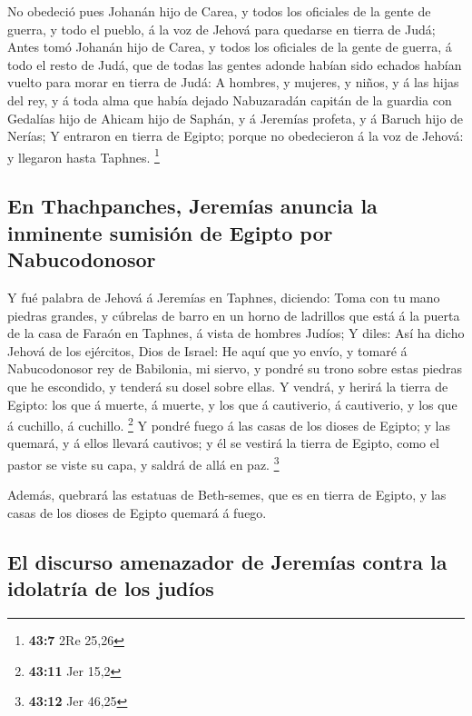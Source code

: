  No obedeció pues Johanán hijo de Carea, y todos los
oficiales de la gente de guerra, y todo el pueblo, á la voz de Jehová
para quedarse en tierra de Judá;  Antes tomó Johanán hijo de
Carea, y todos los oficiales de la gente de guerra, á todo el resto de
Judá, que de todas las gentes adonde habían sido echados habían vuelto
para morar en tierra de Judá:  A hombres, y mujeres, y
niños, y á las hijas del rey, y á toda alma que había dejado Nabuzaradán
capitán de la guardia con Gedalías hijo de Ahicam hijo de Saphán, y á
Jeremías profeta, y á Baruch hijo de Nerías;  Y entraron en
tierra de Egipto; porque no obedecieron á la voz de Jehová: y llegaron
hasta Taphnes. \footnote{\textbf{43:7} 2Re 25,26}

\hypertarget{en-thachpanches-jeremuxedas-anuncia-la-inminente-sumisiuxf3n-de-egipto-por-nabucodonosor}{%
\subsection{En Thachpanches, Jeremías anuncia la inminente sumisión de
Egipto por
Nabucodonosor}\label{en-thachpanches-jeremuxedas-anuncia-la-inminente-sumisiuxf3n-de-egipto-por-nabucodonosor}}

 Y fué palabra de Jehová á Jeremías en Taphnes, diciendo:
 Toma con tu mano piedras grandes, y cúbrelas de barro en un
horno de ladrillos que está á la puerta de la casa de Faraón en Taphnes,
á vista de hombres Judíos;  Y diles: Así ha dicho Jehová de
los ejércitos, Dios de Israel: He aquí que yo envío, y tomaré á
Nabucodonosor rey de Babilonia, mi siervo, y pondré su trono sobre estas
piedras que he escondido, y tenderá su dosel sobre ellas. 
Y vendrá, y herirá la tierra de Egipto: los que á muerte, á muerte, y
los que á cautiverio, á cautiverio, y los que á cuchillo, á cuchillo.
\footnote{\textbf{43:11} Jer 15,2}  Y pondré fuego á las
casas de los dioses de Egipto; y las quemará, y á ellos llevará
cautivos; y él se vestirá la tierra de Egipto, como el pastor se viste
su capa, y saldrá de allá en paz. \footnote{\textbf{43:12} Jer 46,25}

 Además, quebrará las estatuas de Beth-semes, que es en
tierra de Egipto, y las casas de los dioses de Egipto quemará á fuego.

\hypertarget{el-discurso-amenazador-de-jeremuxedas-contra-la-idolatruxeda-de-los-juduxedos}{%
\subsection{El discurso amenazador de Jeremías contra la idolatría de
los
judíos}\label{el-discurso-amenazador-de-jeremuxedas-contra-la-idolatruxeda-de-los-juduxedos}}

